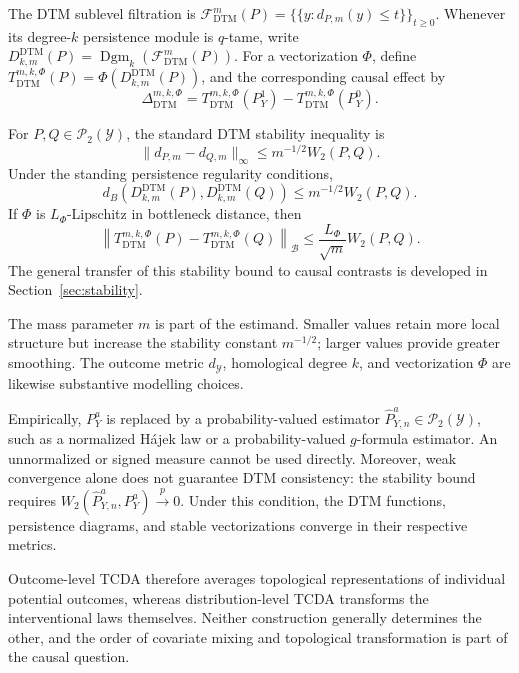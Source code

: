 \documentclass[11pt,a4paper]{article}
\theoremstyle{plain}
\theoremstyle{definition}
\theoremstyle{remark}
\newcommand{\1}{\mathbbm{1}}
\begin{document}
The DTM sublevel filtration is
\(\mathcal F_{\mathrm{DTM}}^m(P) = \bigl\{
\{y:d_{P,m}(y)\leq t\} \bigr\}_{t\geq0}\). Whenever its degree-\(k\) persistence module is \(q\)-tame, write
\(D_{k,m}^{\mathrm{DTM}}(P) = \operatorname{Dgm}_k(
\mathcal F_{\mathrm{DTM}}^m(P))\). For a vectorization \(\Phi\), define \(T_{\mathrm{DTM}}^{m,k,\Phi}(P) =
\Phi(D_{k,m}^{\mathrm{DTM}}(P))\), and the corresponding causal effect by
\[
\Delta_{\mathrm{DTM}}^{m,k,\Phi}
=
T_{\mathrm{DTM}}^{m,k,\Phi}(P_Y^1)
-
T_{\mathrm{DTM}}^{m,k,\Phi}(P_Y^0).
\]

For \(P,Q\in\mathcal P_2(\mathcal Y)\), the standard DTM stability inequality is
\[
\|d_{P,m}-d_{Q,m}\|_\infty
\leq
m^{-1/2}W_2(P,Q).
\]
Under the standing persistence regularity conditions,
\[
d_B\left(
D_{k,m}^{\mathrm{DTM}}(P),
D_{k,m}^{\mathrm{DTM}}(Q)
\right)
\leq
m^{-1/2}W_2(P,Q).
\]
If \(\Phi\) is \(L_\Phi\)-Lipschitz in bottleneck distance, then
\[
\left\|
T_{\mathrm{DTM}}^{m,k,\Phi}(P)
-
T_{\mathrm{DTM}}^{m,k,\Phi}(Q)
\right\|_{\mathcal B}
\leq
\frac{L_\Phi}{\sqrt m}W_2(P,Q).
\]
The general transfer of this stability bound to causal contrasts is developed in Section~\ref{sec:stability}.

The mass parameter \(m\) is part of the estimand. Smaller values retain more local structure but increase the stability constant \(m^{-1/2}\); larger values provide greater smoothing. The outcome metric \(d_{\mathcal Y}\), homological degree \(k\), and vectorization \(\Phi\) are likewise substantive modelling choices.

Empirically, \(P_Y^a\) is replaced by a probability-valued estimator
\(\widehat P_{Y,n}^a\in\mathcal P_2(\mathcal Y)\), such as a normalized Hájek law or a probability-valued \(g\)-formula estimator. An unnormalized or signed measure cannot be used directly. Moreover, weak convergence alone does not guarantee DTM consistency: the stability bound requires
\(W_2(\widehat P_{Y,n}^a,P_Y^a)\xrightarrow{p}0\). Under this condition, the DTM functions, persistence diagrams, and stable vectorizations converge in their respective metrics.

Outcome-level TCDA therefore averages topological representations of individual potential outcomes, whereas distribution-level TCDA transforms the interventional laws themselves. Neither construction generally determines the other, and the order of covariate mixing and topological transformation is part of the causal question.


\end{document}
